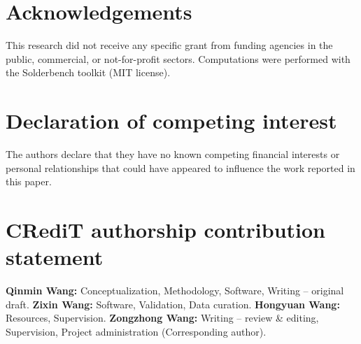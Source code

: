 \documentclass[3p]{elsarticle}
\begin{document}
\section{Acknowledgements}
This research did not receive any specific grant from funding agencies in the public, commercial, or not-for-profit sectors. Computations were performed with the Solderbench toolkit (MIT license).

\section*{Declaration of competing interest}
The authors declare that they have no known competing financial interests or personal relationships that could have appeared to influence the work reported in this paper.

\section*{CRediT authorship contribution statement}
\textbf{Qinmin Wang:} Conceptualization, Methodology, Software, Writing -- original draft.
\textbf{Zixin Wang:} Software, Validation, Data curation.
\textbf{Hongyuan Wang:} Resources, Supervision.
\textbf{Zongzhong Wang:} Writing -- review \& editing, Supervision, Project administration (Corresponding author).
\setlength{\bibsep}{0pt}
\end{document}

